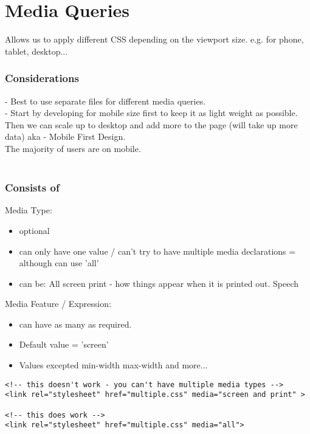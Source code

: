 \documentclass[]{article}
\begin{document}
\section{Media Queries}
Allows us to apply different CSS depending on the viewport size. e.g. for phone, tablet, desktop...
\subsubsection{Considerations}
 - Best to use separate files for different media queries.
\\
 - Start by developing for mobile size first to keep it as light weight as possible.   Then we can scale up to desktop and add more to the page (will take up more data) aka - Mobile First Design.  \\
 The majority of users are on mobile.
\\\\
\subsubsection{Consists of}
Media Type:
\begin{itemize}
	\item optional
	\item can only have one value / can't try to have multiple media declarations = although can use 'all'
	
	\item can be:
	\subitem All
	\subitem screen
	\subitem print - how things appear when it is printed out.
	\subitem Speech
\end{itemize}

Media Feature / Expression:
\begin{itemize}
	\item can have as many as required.
	\item Default value = 'screen'
	\item Values excepted
	\subitem min-width 
	\subitem max-width
	\subitem and more...
\end{itemize}

\begin{lstlisting}
<!-- this doesn't work - you can't have multiple media types -->
<link rel="stylesheet" href="multiple.css" media="screen and print" >

<!-- this does work -->
<link rel="stylesheet" href="multiple.css" media="all">
\end{lstlisting}
\end{document}
